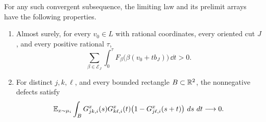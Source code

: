 \begin{lemma}\label{lem:root-line-laws}
For any such convergent subsequence, the limiting law and its prelimit
arrays have the following properties.
\begin{enumerate}
 \item Almost surely, for every $v_0\in L$ with rational coordinates,
 every oriented cut $J$, and every positive rational $\tau$,
 \begin{equation}\label{eq:positive-cut-integral}
  \sum_{\beta\in\mathcal E_J}\int_0^\tau
  F_\beta\bigl(\beta(v_0+t b_J)\bigr)\,\dd t>0.
 \end{equation}
 \item For distinct $j,k,\ell$, and every bounded rectangle
 $B\subset\mathbb R^2$, the nonnegative defects satisfy
 \begin{equation}\label{eq:line-transitivity-defect}
  \mathbb E_{x\sim\mu_i}\int_B
  G_{jk,i}^{x}(s)G_{k\ell,i}^{x}(t)
  \bigl(1-G_{j\ell,i}^{x}(s+t)\bigr)\,\mathop{}\!d s\,\mathop{}\!d t
  \longrightarrow0.
 \end{equation}
\end{enumerate}
\end{lemma}

